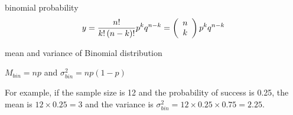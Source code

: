 \begin{frame}
binomial probability
\[y = \frac{{n!}}{{k!\left( {n - k} \right)!}}p^k q^{n - k} = \left( {\begin{array}{*{20}c} n \\ k \\ \end{array}} \right)p^k q^{n -
k}\]

mean and variance of Binomial distribution

$M_{bin} = np$  and $\sigma ^2 _{bin} = np(1-p)$

For example, if the sample size is 12 and the probability of
success is 0.25, the mean is $12 \times 0.25 = 3$ and the variance
is $\sigma ^2 _{bin} = 12 \times 0.25 \times 0.75 = 2.25$.
\end{frame}
